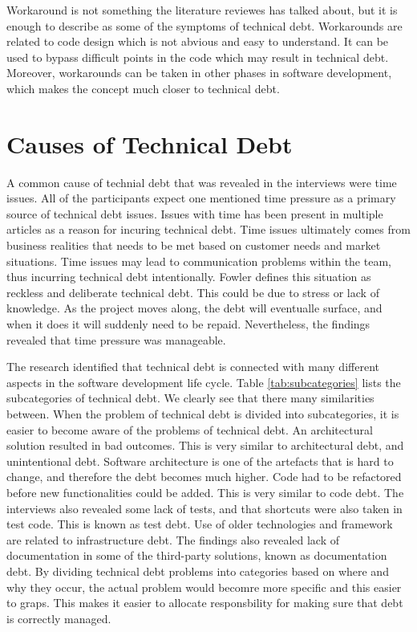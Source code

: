 Workaround is not something the literature reviewes has talked about, but it is enough to describe as some of the symptoms of technical debt. Workarounds are related to code design which is not abvious and easy to understand. It can be used to bypass difficult points in the code which may result in technical debt. Moreover, workarounds can be taken in other phases in software development, which makes the concept much closer to technical debt.

\section{Causes of Technical Debt}
A common cause of technial debt that was revealed in the interviews were time issues. All of the participants expect one mentioned time pressure as a primary source of technical debt issues. Issues with time has been present in multiple articles as a reason for incuring technical debt\cite{p29-cunningham,foser076-brown,zazworka2011investigating,p8-codabux,p50-allman,lim-taksande}. Time issues ultimately comes from business realities that needs to be met based on customer needs and market situations. Time issues may lead to communication problems within the team, thus incurring technical debt intentionally. Fowler defines this situation as reckless and deliberate technical debt\cite{url-fowler}. This could be due to stress or lack of knowledge. As the project moves along, the debt will eventualle surface, and when it does it will suddenly need to be repaid. Nevertheless, the findings revealed that time pressure was manageable.

The research identified that technical debt is connected with many different aspects in the software development life cycle. Table \ref{tab:subcategories} lists the subcategories of technical debt. We clearly see that there many similarities between. When the problem of technical debt is divided into subcategories, it is easier to become aware of the problems of technical debt. An architectural solution resulted in bad outcomes. This is very similar to architectural debt, and unintentional debt. Software architecture is one of the artefacts that is hard to change, and therefore the debt becomes much higher. Code had to be refactored before new functionalities could be added. This is very similar to code debt\cite{li2015systematic}. The interviews also revealed some lack of tests, and that shortcuts were also taken in test code. This is known as test debt\cite{li2015systematic}. Use of older technologies and framework are related to infrastructure debt\cite{li2015systematic}. The findings also revealed lack of documentation in some of the third-party solutions, known as documentation debt\cite{li2015systematic}. By dividing technical debt problems into categories based on where and why they occur, the actual problem would becomre more specific and this easier to graps. This makes it easier to allocate responsbility for making sure that debt is correctly managed.

